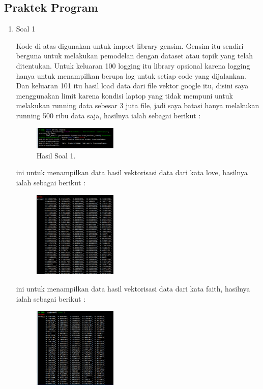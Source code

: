\subsection{Praktek Program}
\begin{enumerate}
	\item Soal 1
	\hfill\break
	
	Kode di atas digunakan untuk import library gensim. Gensim itu sendiri berguna untuk melakukan pemodelan dengan dataset atau topik yang telah ditentukan. Untuk keluaran 100 logging itu library opsional karena logging hanya untuk menampilkan berupa log untuk setiap code yang dijalankan. Dan keluaran 101 itu hasil load data dari file vektor google itu, disini saya menggunakan limit karena kondisi laptop yang tidak mempuni untuk melakukan running data sebesar 3 juta file, jadi saya batasi hanya melakukan running 500 ribu data saja, hasilnya ialah sebagai berikut : 
	\begin{figure}[H]
	\centering
		\includegraphics[width=4cm]{figures/1174073/tugas5/materi/hasil1_1.PNG}
		\caption{Hasil Soal 1.}
	\end{figure}

	\hfill\break
	
	ini untuk menampilkan data hasil vektorisasi data dari kata love, hasilnya ialah sebagai berikut : 
	\begin{figure}[H]
	\centering
		\includegraphics[width=4cm]{figures/1174073/tugas5/materi/hasil1_2.PNG}
	\end{figure}

	\hfill\break
	
	ini untuk menampilkan data hasil vektorisasi data dari kata faith, hasilnya ialah sebagai berikut : 
	\begin{figure}[H]
	\centering
		\includegraphics[width=4cm]{figures/1174073/tugas5/materi/hasil1_3.PNG}
	\end{figure}


\end{enumerate}
